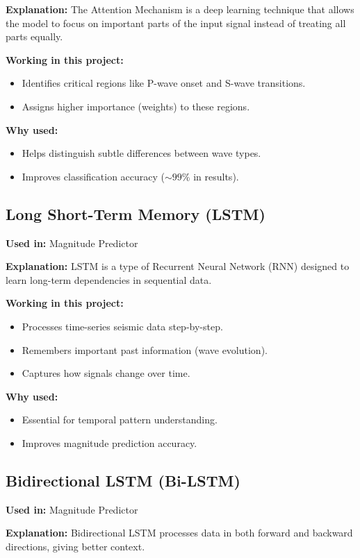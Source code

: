\documentclass[a4paper,12pt]{report}
\begin{document}
\textbf{Explanation:} The Attention Mechanism is a deep learning technique that allows the model to focus on important parts of the input signal instead of treating all parts equally.

\textbf{Working in this project:}
\begin{itemize}
\item Identifies critical regions like P-wave onset and S-wave transitions.
\item Assigns higher importance (weights) to these regions.
\end{itemize}

\textbf{Why used:}
\begin{itemize}
\item Helps distinguish subtle differences between wave types.
\item Improves classification accuracy (\(\sim 99\%\) in results).
\end{itemize}

\subsection{Long Short-Term Memory (LSTM)}
\textbf{Used in:} Magnitude Predictor

\textbf{Explanation:} LSTM is a type of Recurrent Neural Network (RNN) designed to learn long-term dependencies in sequential data.

\textbf{Working in this project:}
\begin{itemize}
\item Processes time-series seismic data step-by-step.
\item Remembers important past information (wave evolution).
\item Captures how signals change over time.
\end{itemize}

\textbf{Why used:}
\begin{itemize}
\item Essential for temporal pattern understanding.
\item Improves magnitude prediction accuracy.
\end{itemize}

\subsection{Bidirectional LSTM (Bi-LSTM)}
\textbf{Used in:} Magnitude Predictor

\textbf{Explanation:} Bidirectional LSTM processes data in both forward and backward directions, giving better context.
\end{document}
